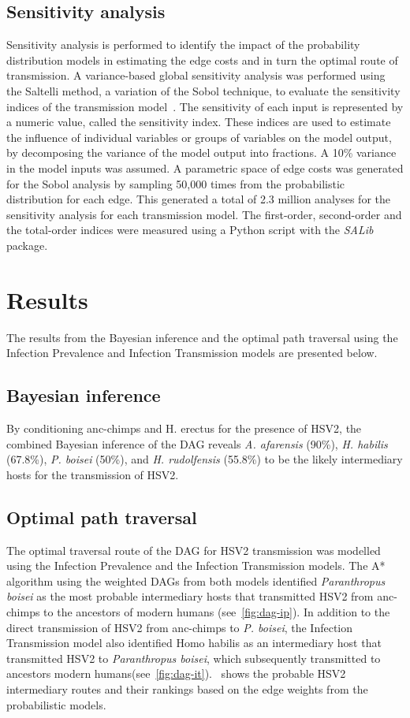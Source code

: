 \documentclass[fleqn,10pt]{wlscirep}
\begin{document}
\subsection*{Sensitivity analysis}
Sensitivity analysis is performed to identify the impact of the probability distribution models in estimating the edge costs and in turn the optimal route of transmission. A variance-based global sensitivity analysis was performed using the Saltelli method, a variation of the Sobol technique, to evaluate the sensitivity indices of the transmission model~\citep{Sobol2001,Saltelli2010}. The sensitivity of each input is represented by a numeric value, called the sensitivity index. These indices are used to estimate the influence of individual variables or groups of variables on the model output, by decomposing the variance of the model output into fractions. A 10\% variance in the model inputs was assumed. A parametric space of edge costs was generated for the Sobol analysis by sampling 50,000 times from the probabilistic distribution for each edge. This generated a total of 2.3 million analyses for the sensitivity analysis for each transmission model. The first-order, second-order and the total-order indices were measured using a Python script with the \textit{SALib} package. 

\section*{Results}

The results from the Bayesian inference and the optimal path traversal using the Infection Prevalence and Infection Transmission models are presented below.

\subsection*{Bayesian inference}
By conditioning anc-chimps and H. erectus for the presence of HSV2, the combined Bayesian inference of the DAG reveals \textit{A. afarensis} (90\%), \textit{H. habilis} (67.8\%), \textit{P. boisei}  (50\%), and \textit{H. rudolfensis} (55.8\%) to be the likely intermediary hosts for the transmission of HSV2.

\subsection*{Optimal path traversal}
The optimal traversal route of the DAG for HSV2 transmission was modelled using the Infection Prevalence and the Infection Transmission models. The A* algorithm using the weighted DAGs from both models identified \textit{Paranthropus boisei} as the most probable intermediary hosts that transmitted HSV2 from anc-chimps to the ancestors of modern humans (see~\cref{fig:dag-ip}). In addition to the direct transmission of HSV2 from anc-chimps to \textit{P. boisei}, the Infection Transmission model also identified Homo habilis as an intermediary host that transmitted HSV2 to \textit{Paranthropus boisei}, which subsequently transmitted to ancestors modern humans(see~\cref{fig:dag-it}).~ shows the probable HSV2 intermediary routes and their rankings based on the edge weights from the probabilistic models. 
\end{document}
